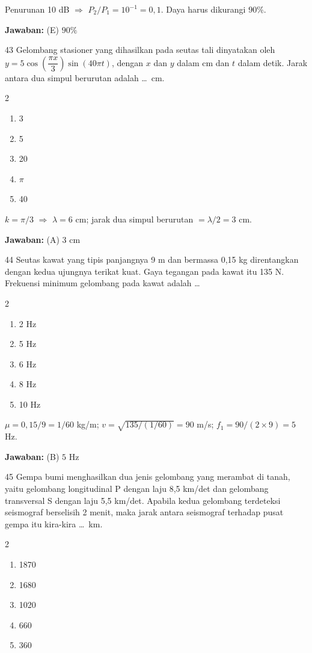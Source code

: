 \documentclass[11pt]{article}
\newenvironment{pilB}{%
  \par\smallskip\begin{multicols}{2}
  \begin{enumerate}[label=(\Alph*),leftmargin=*,itemsep=1pt,topsep=3pt]}%
  {\end{enumerate}\end{multicols}}
\newcommand{\jawaban}[1]{%
  \noindent\colorbox{gold!30}{\parbox{\dimexpr\linewidth-2\fboxsep\relax}{%
    \textbf{Jawaban:} #1}}\par\smallskip}
\begin{document}
\begin{pembox}
Penurunan 10 dB $\Rightarrow$ $P_2/P_1=10^{-1}=0{,}1$. Daya harus dikurangi $90\%$.
\jawaban{(E) $90\%$}
\end{pembox}

\begin{soal}{43}
Gelombang stasioner yang dihasilkan pada seutas tali dinyatakan oleh
$y=5\cos\!\left(\dfrac{\pi x}{3}\right)\sin(40\pi t)$, dengan $x$ dan
$y$ dalam cm dan $t$ dalam detik. Jarak antara dua simpul berurutan
adalah \ldots\ cm.
\begin{pilB}
  \item 3 \item 5 \item 20 \item $\pi$ \item 40
\end{pilB}
\end{soal}

\begin{pembox}
$k=\pi/3$ $\Rightarrow$ $\lambda=6$ cm; jarak dua simpul berurutan $=\lambda/2=3$ cm.
\jawaban{(A) $3$ cm}
\end{pembox}

\begin{soal}{44}
Seutas kawat yang tipis panjangnya 9 m dan bermassa 0,15 kg direntangkan
dengan kedua ujungnya terikat kuat. Gaya tegangan pada kawat itu 135 N.
Frekuensi minimum gelombang pada kawat adalah \ldots
\begin{pilB}
  \item 2 Hz \item 5 Hz \item 6 Hz \item 8 Hz \item 10 Hz
\end{pilB}
\end{soal}

\begin{pembox}
$\mu=0{,}15/9=1/60$ kg/m; $v=\sqrt{135/(1/60)}=90$ m/s; $f_1=90/(2\times9)=5$ Hz.
\jawaban{(B) $5$ Hz}
\end{pembox}

\begin{soal}{45}
Gempa bumi menghasilkan dua jenis gelombang yang merambat di tanah, yaitu
gelombang longitudinal P dengan laju 8,5 km/det dan gelombang transversal
S dengan laju 5,5 km/det. Apabila kedua gelombang terdeteksi seismograf
berselisih 2 menit, maka jarak antara seismograf terhadap pusat gempa
itu kira-kira \ldots\ km.
\begin{pilB}
  \item 1870 \item 1680 \item 1020 \item 660 \item 360
\end{pilB}
\end{soal}
\end{document}
